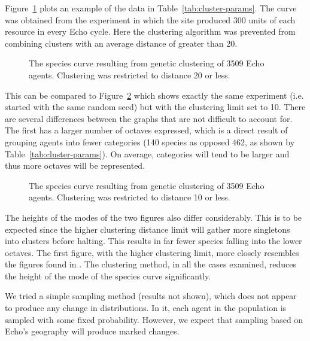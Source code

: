 Figure~\ref{fig:preston.300.20} plots an example of the data in
Table~\ref{tab:cluster-params}.  The curve was obtained from the
experiment in which the site produced 300 units of each resource in
every Echo cycle. Here the clustering algorithm was prevented from
combining clusters with an average distance of greater than 20.
\begin{figure}
\begin{center}
\leavevmode
\epsfysize=3in
\caption{The species curve resulting from genetic clustering of 3509
Echo agents. Clustering was restricted to distance 20 or less.
\label{fig:preston.300.20}}
\end{center}
\end{figure}
This can be compared to Figure~\ref{fig:preston.300.10} which shows
exactly the same experiment (i.e. started with the same random seed)
but with the clustering limit set to 10. There are several differences
between the graphs that are not difficult to account for. The first
has a larger number of octaves expressed, which is a direct result of
grouping agents into fewer categories (140 species as opposed 462, as
shown by Table~\ref{tab:cluster-params}). On average, categories will
tend to be larger and thus more octaves will be represented.
\begin{figure}
\begin{center}
\leavevmode
\epsfysize=3in
\caption{The species curve resulting from genetic clustering of 3509
Echo agents. Clustering was restricted to distance 10 or less.
\label{fig:preston.300.10}}
\end{center}
\end{figure}
The heights of the modes of the two figures also differ considerably.
This is to be expected since the higher clustering distance limit will
gather more singletons into clusters before halting. This results in
far fewer species falling into the lower octaves. The first figure,
with the higher clustering limit, more closely resembles the figures
found in \cite{Preston48}. The clustering method, in all the cases
examined, reduces the height of the mode of the species curve 
significantly.

We tried a simple sampling method (results not shown), which does
not appear to produce any change in distributions.  In it, each agent
in the population is sampled with some fixed probability.  However, we
expect that sampling based on Echo's geography will produce marked
changes.

